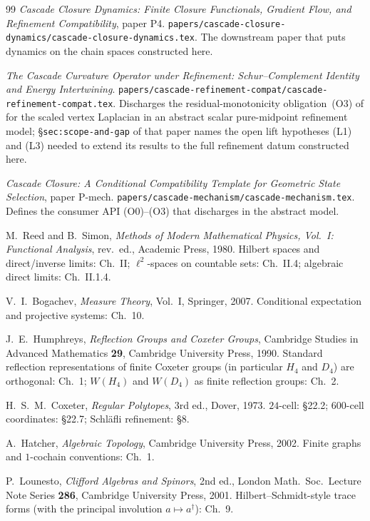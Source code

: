 \documentclass[11pt, a4paper]{amsart}
\theoremstyle{definition}
\begin{document}
\begin{thebibliography}{99}
\emph{Cascade Closure Dynamics: Finite Closure Functionals,
Gradient Flow, and Refinement Compatibility}, paper P4.
\texttt{papers/cascade-closure-dynamics/cascade-closure-dynamics.tex}.
The downstream paper that puts dynamics on the chain spaces
constructed here.

\emph{The Cascade Curvature Operator under Refinement:
Schur--Complement Identity and Energy Intertwining}.
\texttt{papers/cascade-refinement-compat/cascade-refinement-compat.tex}.
Discharges the residual-monotonicity obligation~(O3) of
\cite{CascadeMechanism} for the scaled vertex Laplacian in an
abstract scalar pure-midpoint refinement model;
\S\texttt{sec:scope-and-gap} of that paper names the open lift
hypotheses (L1) and (L3) needed to extend its results to the full
refinement datum constructed here.

\emph{Cascade Closure: A Conditional Compatibility Template for
Geometric State Selection}, paper P-mech.
\texttt{papers/cascade-mechanism/cascade-mechanism.tex}.
Defines the consumer API (O0)--(O3) that
\cite{CascadeRefinementCompat} discharges in the abstract model.

M.~Reed and B.~Simon, \emph{Methods of Modern Mathematical
Physics, Vol.~I: Functional Analysis}, rev.\ ed., Academic Press,
1980. Hilbert spaces and direct/inverse limits: Ch.~II;
$\ell^2$-spaces on countable sets: Ch.~II.4; algebraic direct
limits: Ch.~II.1.4.

V.~I.~Bogachev, \emph{Measure Theory}, Vol.~I, Springer, 2007.
Conditional expectation and projective systems: Ch.~10.

J.~E.~Humphreys, \emph{Reflection Groups and Coxeter Groups},
Cambridge Studies in Advanced Mathematics \textbf{29}, Cambridge
University Press, 1990. Standard reflection representations of
finite Coxeter groups (in particular $H_4$ and $D_4$) are
orthogonal: Ch.~1; $W(H_4)$ and $W(D_4)$ as finite reflection
groups: Ch.~2.

H.~S.~M.~Coxeter, \emph{Regular Polytopes}, 3rd ed., Dover, 1973.
$24$-cell: \S 22.2; $600$-cell coordinates: \S 22.7;
Schl\"{a}fli refinement: \S 8.

A.~Hatcher, \emph{Algebraic Topology}, Cambridge University
Press, 2002. Finite graphs and $1$-cochain conventions: Ch.~1.

P.~Lounesto, \emph{Clifford Algebras and Spinors}, 2nd ed., London
Math.\ Soc.\ Lecture Note Series \textbf{286}, Cambridge
University Press, 2001. Hilbert--Schmidt-style trace forms (with
the principal involution $a \mapsto a^\dagger$): Ch.~9.

\end{thebibliography}
\end{document}
